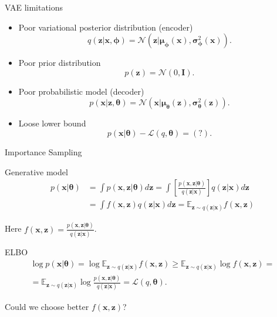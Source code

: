 \documentclass{beamer}
\newcommand{\bx}{\mathbf{x}}
\newcommand{\bz}{\mathbf{z}}
\newcommand{\bmu}{\boldsymbol{\mu}}
\newcommand{\bsigma}{\boldsymbol{\sigma}}
\newcommand{\btheta}{\boldsymbol{\theta}}
\newcommand{\bphi}{\boldsymbol{\phi}}
\begin{document}
\begin{frame}{VAE limitations}
	\begin{itemize}
		\item Poor variational posterior distribution (encoder)
		\[
		q(\bz | \bx, \bphi) = \mathcal{N}(\bz| \bmu_{\bphi}(\bx), \bsigma^2_{\bphi}(\bx)).
		\]
		\item Poor prior distribution
		\[
		p(\bz) = \mathcal{N}(0, \mathbf{I}).
		\]
		\item Poor probabilistic model (decoder)
		\[
		p(\bx | \bz, \btheta) = \mathcal{N}(\bx| \bmu_{\btheta}(\bz), \bsigma^2_{\btheta}(\bz)).
		\]
		\item Loose lower bound
		\[
		p(\bx | \btheta) - \mathcal{L}(q, \btheta) = (?).
		\]
	\end{itemize}
\end{frame}
\begin{frame}{Importance Sampling}
	\begin{block}{Generative model}
		\vspace{-0.5cm}
		\begin{align*}
			p(\bx | \btheta) &= \int p(\bx, \bz | \btheta) d\bz = \int \left[\frac{p(\bx, \bz | \btheta)}{q(\bz | \bx)} \right] q(\bz | \bx) d\bz \\
			&= \int f(\bx, \bz) q(\bz | \bx) d\bz = \mathbb{E}_{\bz \sim q(\bz | \bx)} f(\bx, \bz)
		\end{align*}
	\end{block}
	Here $f(\bx, \bz) = \frac{p(\bx, \bz | \btheta)}{q(\bz | \bx)}$.
	\begin{block}{ELBO}
		\vspace{-0.5cm}
		\begin{multline*}
			\log p(\bx | \btheta) = \log \mathbb{E}_{\bz \sim q(\bz | \bx)} f(\bx, \bz)
			\geq \mathbb{E}_{\bz \sim q(\bz | \bx)} \log f(\bx, \bz) = \\
			= \mathbb{E}_{\bz \sim q(\bz | \bx)} \log \frac{p(\bx, \bz | \btheta)}{q(\bz | \bx)} = \mathcal{L}(q, \btheta).
		\end{multline*}
	\end{block}
	Could we choose better $f(\bx, \bz)$? 
\end{frame}
\end{document}
